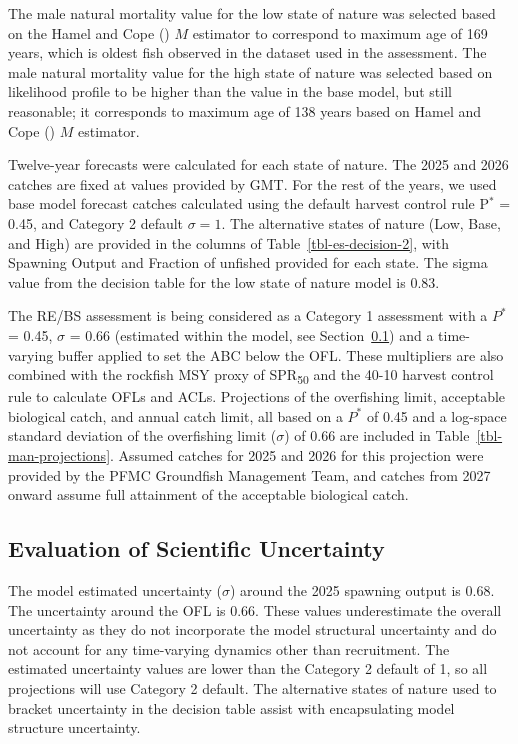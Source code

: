 \documentclass[
]{scrartcl}
\begin{document}
The male natural mortality value for the low state of nature was
selected based on the Hamel and Cope
() \(M\) estimator to
correspond to maximum age of 169 years, which is oldest fish observed in
the dataset used in the assessment. The male natural mortality value for
the high state of nature was selected based on likelihood profile to be
higher than the value in the base model, but still reasonable; it
corresponds to maximum age of 138 years based on Hamel and Cope
() \(M\) estimator.

Twelve-year forecasts were calculated for each state of nature. The 2025
and 2026 catches are fixed at values provided by GMT. For the rest of
the years, we used base model forecast catches calculated using the
default harvest control rule P\(^*\) = 0.45, and Category 2 default
\(\sigma = 1\). The alternative states of nature (Low, Base, and High)
are provided in the columns of Table~\ref{tbl-es-decision-2}, with
Spawning Output and Fraction of unfished provided for each state. The
sigma value from the decision table for the low state of nature model is
0.83.

The RE/BS assessment is being considered as a Category 1 assessment with
a \(P^*\) = 0.45, \(\sigma\) = 0.66 (estimated within the model, see
Section~\ref{sec-uncertainty}) and a time-varying buffer applied to set
the ABC below the OFL. These multipliers are also combined with the
rockfish MSY proxy of SPR\textsubscript{50} and the 40-10 harvest
control rule to calculate OFLs and ACLs. Projections of the overfishing
limit, acceptable biological catch, and annual catch limit, all based on
a \(P^*\) of 0.45 and a log-space standard deviation of the overfishing
limit (\(\sigma\)) of 0.66 are included in
Table~\ref{tbl-man-projections}. Assumed catches for 2025 and 2026 for
this projection were provided by the PFMC Groundfish Management Team,
and catches from 2027 onward assume full attainment of the acceptable
biological catch.

\subsection{Evaluation of Scientific Uncertainty}\label{sec-uncertainty}

The model estimated uncertainty (\(\sigma\)) around the 2025 spawning
output is 0.68. The uncertainty around the OFL is 0.66. These values
underestimate the overall uncertainty as they do not incorporate the
model structural uncertainty and do not account for any time-varying
dynamics other than recruitment. The estimated uncertainty values are
lower than the Category 2 default of 1, so all projections will use
Category 2 default. The alternative states of nature used to bracket
uncertainty in the decision table assist with encapsulating model
structure uncertainty.
\end{document}
